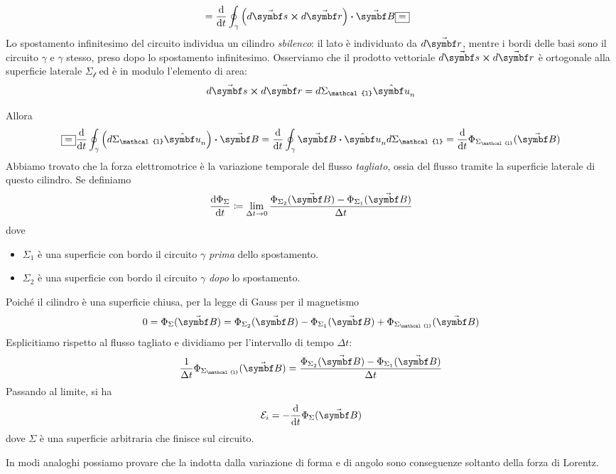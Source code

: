 \begin{demonstration}
\begin{align*}
		&=\dv{t} \oint_{\gamma}\left(d\vba{s}\cross d\vba{r}\right)\vdot \vba{B}\squarequal
	\end{align*}
	Lo spostamento infinitesimo del circuito individua un cilindro \textit{sbilenco}: il lato è individuato da $d\vba{r}$, mentre i bordi delle basi sono il circuito $\gamma$ e $\gamma$ stesso, preso dopo lo spostamento infinitesimo. Osserviamo che il prodotto vettoriale $d\vba{s}\cross d\vba{r}$ è ortogonale alla superficie laterale $\Sigma_{\mathcal{l}}$ ed è in modulo l'elemento di area:
	\begin{equation*}
		d\vba s\cross d\vba r=d\Sigma_{\mathcal{l}}\vbh u_n
	\end{equation*}

	Allora
	\begin{equation*}
		\squarequal \dv{t} \oint_{\gamma}\left(d\Sigma_{\mathcal{l}}\vbh{u}_n\right)\vdot \vba{B}=\dv{t} \oint_{\gamma}\vba{B} \vdot \vbh{u}_nd\Sigma_{\mathcal{l}}=\dv{t}\Phi_{\Sigma_{\mathcal{l}}}(\vba{B})
	\end{equation*}
	Abbiamo trovato che la forza elettromotrice è la variazione temporale del flusso \textit{tagliato}, ossia del flusso tramite la superficie laterale di questo cilindro. Se definiamo
	\begin{equation*}
		\dv{\Phi_{\Sigma}}{t}\coloneqq\lim_{\Delta t\to 0}\frac{\Phi_{\Sigma_2}(\vba{B})-\Phi_{\Sigma_1}(\vba{B})}{\Delta t}
	\end{equation*}
	dove
	\begin{itemize}
		\item $\Sigma_1$ è una superficie con bordo il circuito $\gamma$ \textit{prima} dello spostamento.
		\item $\Sigma_2$  è una superficie con bordo il circuito $\gamma$ \textit{dopo} lo spostamento.
	\end{itemize}
	Poiché il cilindro è una superficie chiusa, per la legge di Gauss per il magnetismo
	\begin{equation*}
		0=\Phi_{\Sigma}(\vba{B})=\Phi_{\Sigma_2}(\vba{B})-\Phi_{\Sigma_1}(\vba{B})+\Phi_{\Sigma_{\mathcal{l}}}(\vba{B})
	\end{equation*}
	Esplicitiamo rispetto al flusso tagliato e dividiamo per l'intervallo di tempo $\Delta t$:
	\begin{equation*}
		\frac{1}{\Delta t}\Phi_{\Sigma_{\mathcal{l}}}(\vba{B})=\frac{\Phi_{\Sigma_2}(\vba{B})-\Phi_{\Sigma_1}(\vba{B})}{\Delta t}
	\end{equation*}
	Passando al limite, si ha
	\begin{equation*}
		\mathcal{E}_i=-\dv{t}\Phi_{\Sigma}(\vba{B})
	\end{equation*}
	dove $\Sigma$ è una superficie arbitraria che finisce sul circuito.
\end{demonstration}
In modi analoghi possiamo provare che la \fem indotta dalla variazione di forma e di angolo sono conseguenze soltanto della forza di Lorentz.
